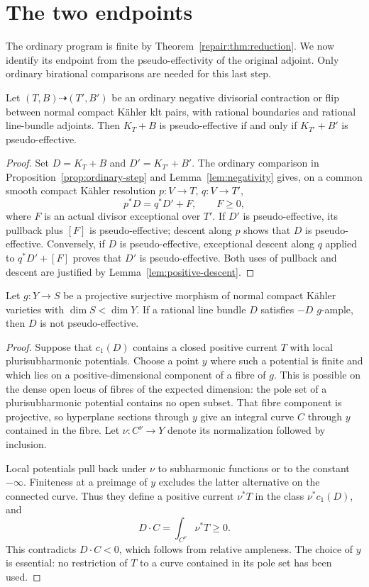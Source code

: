 \section{The two endpoints}\label{sec:endpoints}

The ordinary program is finite by Theorem~\ref{repair:thm:reduction}.
We now identify its endpoint from the pseudo-effectivity of the original
adjoint.  Only ordinary birational comparisons are needed for this last step.

\begin{lemma}\label{lem:pe-step}
Let $(T,B)\dashrightarrow(T',B')$ be an ordinary negative divisorial
contraction or flip between normal compact Kähler klt pairs, with rational
boundaries and rational line-bundle adjoints.  Then $K_T+B$ is pseudo-effective if
and only if $K_{T'}+B'$ is pseudo-effective.
\end{lemma}

\begin{proof}
Set $D=K_T+B$ and $D'=K_{T'}+B'$.  The ordinary comparison in
Proposition~\ref{prop:ordinary-step} and Lemma~\ref{lem:negativity} gives,
on a common smooth compact Kähler resolution $p:V\to T$, $q:V\to T'$,
\[
 p^*D=q^*D'+F,\qquad F\geq0,
\]
where $F$ is an actual divisor exceptional over $T'$.
If $D'$ is pseudo-effective, its pullback plus $[F]$ is pseudo-effective;
descent along $p$ shows that $D$ is pseudo-effective.
Conversely, if $D$ is pseudo-effective, exceptional descent along $q$
applied to $q^*D'+[F]$ proves that $D'$ is pseudo-effective.
Both uses of pullback and descent are justified by
Lemma~\ref{lem:positive-descent}.
\end{proof}

\begin{lemma}\label{lem:mori-not-pe}
Let $g:Y\to S$ be a projective surjective morphism of normal compact Kähler
varieties with $\dim S<\dim Y$.  If a rational line bundle $D$ satisfies
$-D$ $g$-ample, then $D$ is not pseudo-effective.
\end{lemma}

\begin{proof}
Suppose that $c_1(D)$ contains a closed positive current $T$ with local
plurisubharmonic potentials.  Choose a point $y$ where such a potential is
finite and which lies on a positive-dimensional component of a fibre of
$g$.  This is possible on the dense open locus of fibres of the expected
dimension: the pole set of a plurisubharmonic potential contains no open
subset.  That fibre component is projective, so hyperplane sections through
$y$ give an integral curve $C$ through $y$ contained in the fibre.
Let $\nu:C^\nu\to Y$ denote its normalization followed by inclusion.

Local potentials pull back under $\nu$ to subharmonic functions or to the
constant $-\infty$.  Finiteness at a preimage of $y$ excludes the latter
alternative on the connected curve.  Thus they define a positive current
$\nu^*T$ in the class $\nu^*c_1(D)$, and
\[
 D\cdot C=\int_{C^\nu}\nu^*T\geq0.
\]
This contradicts $D\cdot C<0$, which follows from relative ampleness.
The choice of $y$ is essential: no restriction of $T$ to a curve contained
in its pole set has been used.
\end{proof}


